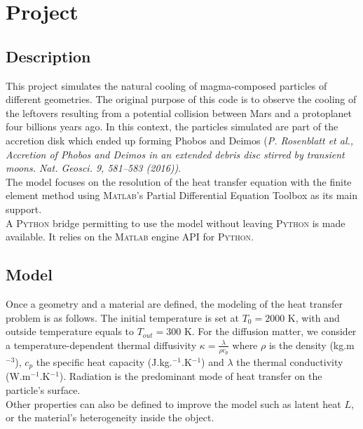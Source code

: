 \section{Project}

\subsection{Description}

This project simulates the natural cooling of magma-composed particles of different geometries. The original purpose of this code is to observe the cooling of the leftovers resulting from a potential collision between Mars and a protoplanet four billions years ago. In this context, the particles simulated are part of the accretion disk which ended up forming Phobos and Deimos (\textit{P. Rosenblatt et al., Accretion of Phobos and Deimos in an extended debris disc stirred by transient moons. Nat. Geosci. 9, 581–583 (2016))}.\\

The model focuses on the resolution of the heat transfer equation with the finite element method using \textsc{Matlab}'s Partial Differential Equation Toolbox as its main support.\\

A \textsc{Python} bridge permitting to use the model without leaving \textsc{Python} is made available. It relies on the \textsc{Matlab} engine API for \textsc{Python}.\\


\subsection{Model}

Once a geometry and a material are defined, the modeling of the heat transfer problem is as follows. The initial temperature is set at $T_0 = 2000$ K, with and outside temperature equals to $T_{out} = 300$ K. For the diffusion matter, we consider a temperature-dependent thermal diffusivity $\kappa = \frac{\lambda}{\rho c_p}$ where $\rho$ is the density (kg.m$^{-3}$), $c_p$ the specific heat capacity (J.kg.$^{-1}$.K$^{-1}$) and $\lambda$ the thermal conductivity (W.m$^{-1}$.K$^{-1}$). Radiation is the predominant mode of heat transfer on the particle's surface.\\

Other properties can also be defined to improve the model such as latent heat $L$, or the material's heterogeneity inside the object.
